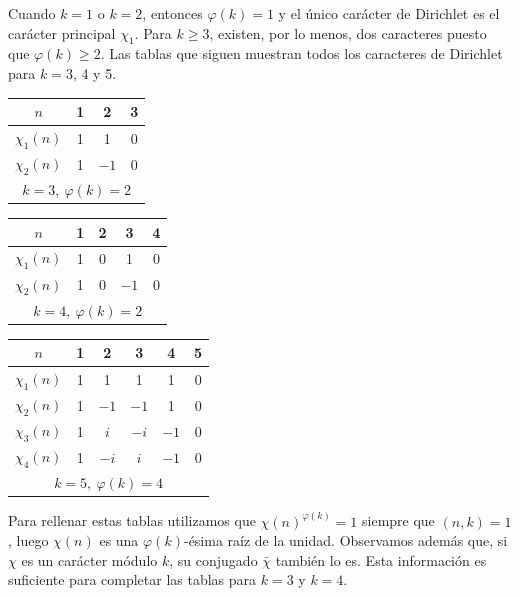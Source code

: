 \documentclass[12pt,a4paper]{book}
\begin{document}
    \begin{ejemplo}
        Cuando $k=1$ o $k=2$, entonces $\varphi(k)=1$ y el único carácter de Dirichlet es
        el carácter principal $\chi_{1}$. Para $k\geq3$, existen, por lo menos, dos
        caracteres puesto que $\varphi(k)\geq2$. Las tablas que siguen muestran todos los
        caracteres de Dirichlet para $k=3$, 4 y 5.

        \begin{center}
            \small
            \begin{tabular}{c|ccc}
                $n$&1&2&3\\\hline
                $\chi_{1}(n)$&1&1&0\\
                $\chi_{2}(n)$&1&$-1$&0\\
                \multicolumn{4}{c}{$k=3,\ \varphi(k)=2$}
            \end{tabular}
            \qquad
            \begin{tabular}{c|cccc}
                $n$&1&2&3&4\\\hline
                $\chi_{1}(n)$&1&0&1&0\\
                $\chi_{2}(n)$&1&0&$-1$&0\\
                \multicolumn{5}{c}{$k=4,\ \varphi(k)=2$}
            \end{tabular}
            \qquad
            \begin{tabular}{c|ccccc}
                $n$&1&2&3&4&5\\\hline
                $\chi_{1}(n)$&1&1&1&1&0\\
                $\chi_{2}(n)$&1&$-1$&$-1$&1&0\\
                $\chi_{3}(n)$&1&$i$&$-i$&$-1$&0\\
                $\chi_{4}(n)$&1&$-i$&$i$&$-1$&0\\
                \multicolumn{6}{c}{$k=5,\ \varphi(k)=4$}
            \end{tabular}
        \end{center}

        Para rellenar estas tablas utilizamos que $\chi(n)^{\varphi(k)}=1$ siempre que
        $(n,k)=1$, luego $\chi(n)$ es una $\varphi(k)$-ésima raíz de la unidad. Observamos
        además que, si $\chi$ es un carácter módulo $k$, su conjugado $\bar{\chi}$
        también lo es. Esta información es suficiente para completar las tablas para
        $k=3$ y $k=4$.


\end{ejemplo}
\end{document}
